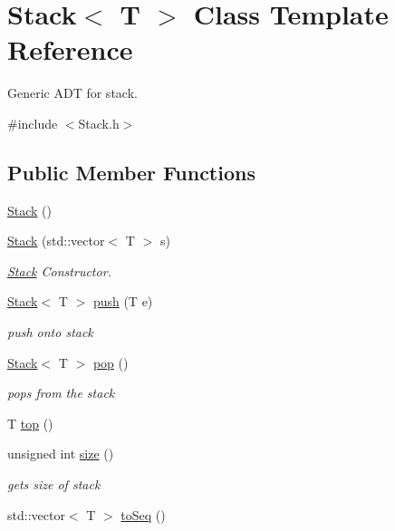 \hypertarget{class_stack}{}\section{Stack$<$ T $>$ Class Template Reference}
\label{class_stack}


Generic A\+DT for stack.  




{\ttfamily \#include $<$Stack.\+h$>$}

\subsection*{Public Member Functions}
\begin{DoxyCompactItemize}
\item 
\hyperlink{class_stack_aefee698059467258bbd79045aca62a63}{Stack} ()
\item 
\hyperlink{class_stack_acf1a315995090bf9cf957ac84175c82c}{Stack} (std\+::vector$<$ T $>$ s)
\begin{DoxyCompactList}\small\item\em \hyperlink{class_stack}{Stack} Constructor. \end{DoxyCompactList}\item 
\hyperlink{class_stack}{Stack}$<$ T $>$ \hyperlink{class_stack_a2f702496e109485c2ce9261f0c629dd1}{push} (T e)
\begin{DoxyCompactList}\small\item\em push onto stack \end{DoxyCompactList}\item 
\hyperlink{class_stack}{Stack}$<$ T $>$ \hyperlink{class_stack_a79085ca78d75f61838c1c2b8f9de968d}{pop} ()
\begin{DoxyCompactList}\small\item\em pops from the stack \end{DoxyCompactList}\item 
T \hyperlink{class_stack_ad461f6de40c8672dbf743068f4515061}{top} ()
\item 
unsigned int \hyperlink{class_stack_ab04985802f97ae3555289c865462bf7f}{size} ()
\begin{DoxyCompactList}\small\item\em gets size of stack \end{DoxyCompactList}\item 
std\+::vector$<$ T $>$ \hyperlink{class_stack_a928be02635c7f5bf2bab3699aee07f52}{to\+Seq} ()
\end{DoxyCompactItemize}


